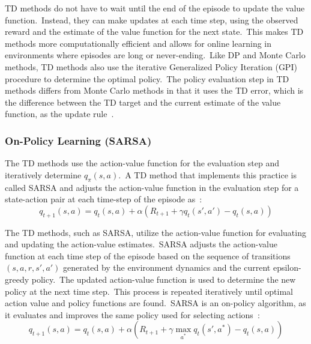 \documentclass[../xlapes02]{subfiles}
\begin{document}
    TD methods do not have to wait until the end of the episode to update the value function.\ Instead, they can make updates at each time step, using the observed reward and the estimate of the value function for the next state.\ This makes TD methods more computationally efficient and allows for online learning in environments where episodes are long or never-ending.\ Like DP and Monte Carlo methods, TD methods also use the iterative Generalized Policy Iteration (GPI) procedure to determine the optimal policy.\ The policy evaluation step in TD methods differs from Monte Carlo methods in that it uses the TD error, which is the difference between the TD target and the current estimate of the value function, as the update rule~\cite{sutton2018reinforcement}.

    \subsubsection{On-Policy Learning (SARSA)}\label{subsubsec:td-sarsa}
    The TD methods use the action-value function for the evaluation step and iteratively determine $q_\pi(s,a)$.\ A TD method that implements this practice is called SARSA and adjusts the action-value function in the evaluation step for a state-action pair at each time-step of the episode as~\cite{sutton2018reinforcement, rl-course-david-silver}:
    \begin{equation}
        \label{eq:sarsa-update}
        q_{t+1}(s,a)=q_t(s,a)+\alpha\left(R_{t+1}+\gamma q_t(s',a')-q_t(s,a)\right)
    \end{equation}

    The TD methods, such as SARSA, utilize the action-value function for evaluating and updating the action-value estimates.\ SARSA adjusts the action-value function at each time step of the episode based on the sequence of transitions $ (s, a, r, s', a') $ generated by the environment dynamics and the current epsilon-greedy policy.\ The updated action-value function is used to determine the new policy at the next time step.\ This process is repeated iteratively until optimal action value and policy functions are found.\ SARSA is an on-policy algorithm, as it evaluates and improves the same policy used for selecting actions~\cite{rl-course-david-silver}:
    \begin{equation}
        \label{eq:sarsa-update-2}
        q_{t+1}(s,a)=q_t(s,a)+\alpha\left(R_{t+1}+\gamma\max_{a^*}q_t(s',a^*)-q_t(s,a)\right)
    \end{equation}
\end{document}
